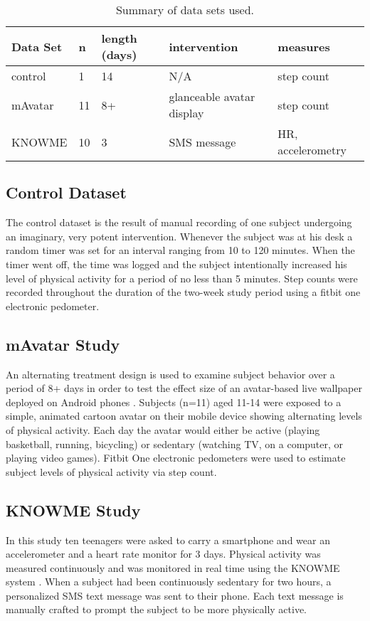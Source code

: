 \noindent
\begin{table}[H]
\resizebox{\columnwidth}{!} {
    \begin{tabular}{ l       |      l  |  p{1cm}      | l | l }
		  Data Set        & n  & length (days) & intervention    & measures \\
		  \hline
		  control         & 1  & 14 & N/A                       & step count         \\
		  mAvatar         & 11 & 8+ & glanceable avatar display & step count         \\
		  KNOWME          & 10 & 3  & SMS message               & HR, accelerometry  \\
    \end{tabular}
}
\caption {Summary of data sets used.}
\end{table}

\subsection{Control Dataset}
The control dataset is the result of manual recording of one subject undergoing an imaginary, very potent intervention.
Whenever the subject was at his desk a random timer was set for an interval ranging from 10 to 120 minutes.
When the timer went off, the time was logged and the subject intentionally increased his level of physical activity for a period of no less than 5 minutes.
Step counts were recorded throughout the duration of the two-week study period using a fitbit one electronic pedometer.

\subsection{mAvatar Study}
An alternating treatment design is used to examine subject behavior over a period of 8+ days in order to test the effect size of an avatar-based live wallpaper deployed on Android phones \cite{murray2013}.
Subjects (n=11) aged 11-14 were exposed to a simple, animated cartoon avatar on their mobile device showing alternating levels of physical activity.
Each day the avatar would either be active (playing basketball, running, bicycling) or sedentary (watching TV, on a computer, or playing video games).
Fitbit One electronic pedometers were used to estimate subject levels of physical activity via step count.

\subsection{KNOWME Study}
In this study ten teenagers were asked to carry a smartphone and wear an accelerometer and a heart rate monitor for 3 days.
Physical activity was measured continuously and was monitored in real time using the KNOWME system \cite{mitra2012}.
When a subject had been continuously sedentary for two hours, a personalized SMS text message was sent to their phone.
Each text message is manually crafted to prompt the subject to be more physically active.


